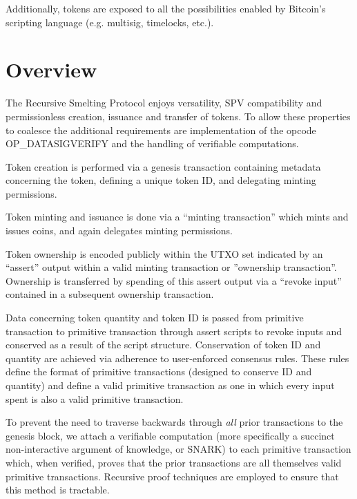 \documentclass[9pt,oneside]{amsart}
\begin{document}
\begin{multicols}{2}
Additionally, tokens are exposed to all the possibilities enabled by Bitcoin's scripting language  (e.g. multisig, timelocks, etc.).

\section{Overview}
The Recursive Smelting Protocol enjoys versatility, SPV compatibility and permissionless creation, issuance and transfer of tokens. To allow these properties to coalesce the additional requirements are implementation of the opcode OP\_DATASIGVERIFY and the handling of verifiable computations.

Token creation is performed via a genesis transaction containing metadata concerning the token, defining a unique token ID, and delegating minting permissions.

Token minting and issuance is done via a ``minting transaction'' which mints and issues coins, and again delegates minting permissions.

Token ownership is encoded publicly within the UTXO set indicated by an ``assert'' output within a valid minting transaction or ''ownership transaction''. Ownership is transferred by spending of this assert output via a ``revoke input'' contained in a subsequent ownership transaction. 

Data concerning token quantity and token ID is passed from primitive transaction to primitive transaction through assert scripts to revoke inputs and conserved as a result of the script structure. Conservation of token ID and quantity are achieved via adherence to user-enforced consensus rules. These rules define the format of primitive transactions (designed to conserve ID and quantity) and define a valid primitive transaction as one in which every input spent is also a valid primitive transaction.

To prevent the need to traverse backwards through \emph{all} prior transactions to the genesis block, we attach a verifiable computation (more specifically a succinct non-interactive argument of knowledge, or SNARK) to each primitive transaction which, when verified, proves that the prior transactions are all themselves valid primitive transactions. Recursive proof techniques are employed to ensure that this method is tractable. 


\end{multicols}
\end{document}
